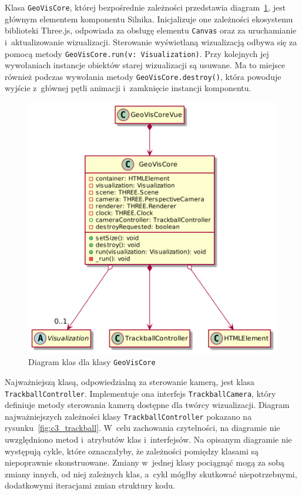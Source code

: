 Klasa \texttt{GeoVisCore}, której bezpośrednie zależności przedstawia diagram~\ref{fig:c3_geo_vis_core}, jest głównym elementem komponentu Silnika. Inicjalizuje one zależności ekosystemu biblioteki Three.js, odpowiada za obsługę elementu \texttt{Canvas} oraz za uruchamianie i~aktualizowanie wizualizacji. Sterowanie wyświetlaną wizualizacją odbywa się za pomocą metody \mbox{\texttt{GeoVisCore.run(v: Visualization)}}. Przy kolejnych jej wywołaniach instancje obiektów starej wizualizacji są usuwane. Ma to miejsce również podczas wywołania metody \mbox{\texttt{GeoVisCore.destroy()}}, która powoduje wyjście z~głównej pętli animacji i~zamknięcie instancji komponentu.

\begin{figure}
    \centering
    \includegraphics[scale=0.3]{diagrams/out/c3_geo_vis_core.png}
    \caption{Diagram klas dla klasy \texttt{GeoVisCore}}
    \label{fig:c3_geo_vis_core}
\end{figure}

Najważniejszą klasą, odpowiedzialną za sterowanie kamerą, jest klasa \texttt{TrackballController}. Implementuje ona interfejs \texttt{TrackballCamera}, który definiuje metody sterowania kamerą dostępne dla twórcy wizualizacji. Diagram najważniejszych zależności klasy \texttt{TrackballController} pokazano na rysunku~\ref{fig:c3_trackball}. W~celu zachowania czytelności, na diagramie nie uwzględniono metod i~atrybutów klas i~interfejsów. Na opisanym diagramie nie występują cykle, które oznaczałyby, że zależności pomiędzy klasami są niepoprawnie skonstruowane. Zmiany w~jednej klasy pociągnąć mogą za sobą zmiany innych, od niej zależnych klas, a~cykl mógłby skutkować niepotrzebnymi, dodatkowymi iteracjami zmian struktury kodu.

